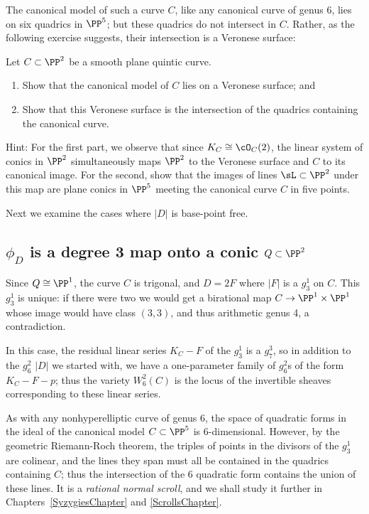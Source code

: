 The canonical model of such a curve $C$, like any canonical curve of genus 6, lies on six quadrics in $\PP^5$; but these quadrics do not intersect in $C$. Rather, as the following exercise suggests, their intersection is a Veronese surface:

\begin{exercise}
Let $C \subset \PP^2$ be a smooth plane quintic curve.
\begin{enumerate}
\item Show that the canonical model of $C$ lies on a Veronese surface; and
\item Show that this Veronese surface is the intersection of the quadrics containing the canonical curve.
\end{enumerate}
\end{exercise}

Hint: For the first part, we observe that since $K_C \cong \cO_C(2)$, the linear system of conics in $\PP^2$ simultaneously maps $\PP^2$ to the Veronese surface and $C$ to its canonical image. For the second, show that the images of lines $\sL  \subset \PP^2$ under this map are plane conics in $\PP^5$ meeting the canonical curve $C$ in five points.

Next we examine the cases where $|D|$ is base-point free.

\subsection{$\phi_{D}$ is a degree 3 map onto a conic $Q \subset \PP^{2}$}

Since $Q  \cong \PP^1$, the curve $C$ is trigonal, and  $D = 2F$ where $|F|$ is a $g^{1}_{3}$ on $C$. This $g^1_3$ is unique: if there were two we would get a birational map $C \to \PP^1\times \PP^1$ whose image would have class $(3,3)$, and thus
arithmetic genus 4, a contradiction.

In this case, the residual linear series $K_C - F$ of the $g^1_3$ is a $g^3_7$, so in addition to the $g^2_6$ $|D|$ we started with, we have a one-parameter family of $g^2_6$s of the form  $K_C - F - p$; thus the variety $W^2_6(C)$ is the locus of the invertible sheaves corresponding to these linear series.

As with any nonhyperelliptic curve of genus 6, the space of quadratic forms in the ideal of the canonical model $C \subset \PP^5$ is 6-dimensional. However, by the geometric Riemann-Roch theorem, the triples of points in the divisors of the $g^1_3$ are colinear,
and the lines they span must all be contained in the quadrics containing $C$; thus the intersection of the 6 quadratic
form contains the union of these lines. It is a \emph{rational normal scroll},
and we shall study it further in Chapters~\ref{SyzygiesChapter} and \ref{ScrollsChapter}.

